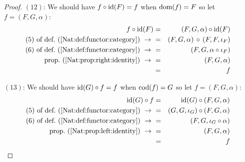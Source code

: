 \begin{proof}
    $(12)$: We should have $f\circ\mbox{\rm id}(F)=f$ when $\mbox{\rm dom}(f)=F$
    so let $f=(F,G,\alpha)$:
        \begin{eqnarray*}f\circ\id(F)
            &=&(F,G,\alpha)\circ\id(F)\\
            \mbox{$(5)$ of def.~(\ref{Nat:def:functor:category})}\ \to\ 
            &=&(F,G,\alpha)\,\circ\,(F,F,\iota_{F})\\
            \mbox{$(6)$ of def.~(\ref{Nat:def:functor:category})}\ \to\ 
            &=&(F,G,\alpha\circ \iota_{F})\\
            \mbox{prop.~(\ref{Nat:prop:right:identity})}\ \to\ 
            &=&(F,G,\alpha)\\
            &=&f
        \end{eqnarray*}

    $(13)$: We should have $\mbox{\rm id}(G)\circ f=f$ when $\mbox{\rm cod}(f)=G$
    so let $f=(F,G,\alpha)$:
        \begin{eqnarray*}\id(G)\circ f
            &=&\id(G)\circ(F,G,\alpha)\\
            \mbox{$(5)$ of def.~(\ref{Nat:def:functor:category})}\ \to\ 
            &=&(G,G,\iota_{G})\circ(F,G,\alpha)\\
            \mbox{$(6)$ of def.~(\ref{Nat:def:functor:category})}\ \to\ 
            &=&(F,G,\iota_{G}\circ \alpha)\\
            \mbox{prop.~(\ref{Nat:prop:left:identity})}\ \to\ 
            &=&(F,G,\alpha)\\
            &=&f
        \end{eqnarray*}
\end{proof}
